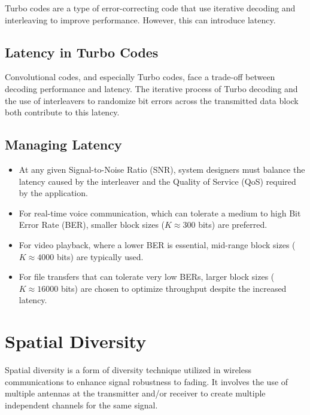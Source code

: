 Turbo codes are a type of error-correcting code that use iterative decoding and interleaving to improve performance. However, this can introduce latency.

\subsection*{Latency in Turbo Codes}
Convolutional codes, and especially Turbo codes, face a trade-off between decoding performance and latency. The iterative process of Turbo decoding and the use of interleavers to randomize bit errors across the transmitted data block both contribute to this latency.

\subsection*{Managing Latency}
\begin{itemize}
    \item At any given Signal-to-Noise Ratio (SNR), system designers must balance the latency caused by the interleaver and the Quality of Service (QoS) required by the application.
    \item For real-time voice communication, which can tolerate a medium to high Bit Error Rate (BER), smaller block sizes (\( K \approx 300 \) bits) are preferred.
    \item For video playback, where a lower BER is essential, mid-range block sizes (\( K \approx 4000 \) bits) are typically used.
    \item For file transfers that can tolerate very low BERs, larger block sizes (\( K \approx 16000 \) bits) are chosen to optimize throughput despite the increased latency.
\end{itemize}






\section*{Spatial Diversity}

Spatial diversity is a form of diversity technique utilized in wireless communications to enhance signal robustness to fading. It involves the use of multiple antennas at the transmitter and/or receiver to create multiple independent channels for the same signal.

